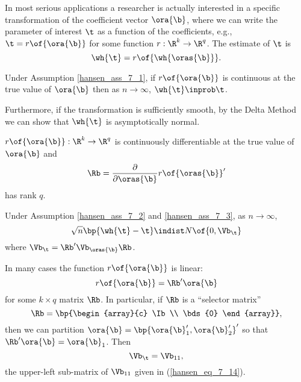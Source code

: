 In most serious applications a researcher is actually interested in a specific transformation of the coefficient vector $\ora{\b}$, where we can write the parameter of interest $\t$ as a function of the coefficients, e.g., $\t = r\of{\ora{\b}}$ for some function $r: \R^k \rightarrow \R^q$. The estimate of $\t$ is 
\begin{equation}
    \notag
    \wh{\t} = r\of{\wh{\oras{\b}}}.
\end{equation}

\begin{theorem}
    \label{hansen_thm_7_8}
    Under Assumption \ref{hansen_ass_7_1}, if $r\of{\ora{\b}}$ is continuous at the true value of $\ora{\b}$ then as $n \rightarrow \infty$, $\wh{\t} \inprob \t$.
\end{theorem}

Furthermore, if the transformation is sufficiently smooth, by the Delta Method we can show that $\wh{\t}$ is asymptotically normal.

\begin{assumption}
    \label{hansen_ass_7_3}
    $r\of{\ora{\b}}: \R^k \rightarrow \R^q$ is continuously differentiable at the true value of $\ora{\b}$ and 
    $$
    \Rb = \frac{\partial}{\partial \oras{\b}} r\of{\oras{\b}}^\prime
    $$
    has rank $q$.
\end{assumption}

\begin{theorem}
    \label{hansen_thm_7_9}

    Under Assumption \ref{hansen_ass_7_2} and \ref{hansen_ass_7_3}, as $n \rightarrow \infty$, 
    \begin{equation}
        \label{hansen_eq_7_25}
        \sqrt{n} \bp{\wh{\t} - \t} \indist N\of{0, \Vb_\t}
    \end{equation}
    where $\Vb_\t = \Rb^\prime \Vb_{\oras{\b}} \Rb$.
\end{theorem}

In many cases the function $r\of{\ora{\b}}$ is linear:
\begin{equation}
    \notag
    r\of{\ora{\b}} = \Rb^\prime \ora{\b}
\end{equation}
for some $k \times q$ matrix $\Rb$. In particular, if $\Rb$ is a ``selector matrix''
\begin{equation}
    \notag 
    \Rb = \bp{\begin{array}{c}
        \Ib \\
        \bds{0}
    \end{array}},
\end{equation}
then we can partition $\ora{\b} = \bp{\ora{\b}_1^{\prime}, \ora{\b}_2^{\prime}}^{\prime}$ so that $\Rb^{\prime} \ora{\b} = \ora{\b}_1$. Then 
\begin{equation}
    \notag 
    \Vb_{\t} = \Vb_{11},
\end{equation}
the upper-left sub-matrix of $\Vb_{11}$ given in (\ref{hansen_eq_7_14}).

